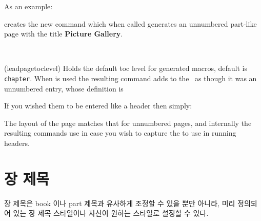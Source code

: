 As an example:
\begin{lcode}
\end{lcode}
creates the new command  which when called generates an unnumbered
part-like page with the title \textbf{Picture Gallery}.

\begin{syntax}
\cmd{\leadpagetoclevel} \\
\end{syntax}
\glossary(leadpagetoclevel)%
{}%
{Holds the default toc level for  generated macros,
default is \texttt{chapter}.}
When  is used the resulting command adds 
to the \toc\ as though it was an unnumbered \cmd{\leadpagetoclevel} entry,
whose definition is
\begin{lcode}
\newcommand*{\leadpagetoclevel}{chapter}
\end{lcode}
If you wished them to be entered like a \cmd{\part} header then simply:
\begin{lcode}
\renewcommand*{\leadpagetoclevel}{part}
\end{lcode}


    The layout of the page matches that for unnumbered \cmd{\part} pages, and 
internally the resulting commands use \cmd{\partmark} in case you 
wish to capture the  to use in running headers.


\section{장 제목}
\label{sec:chapter-headings}


장 제목은 book 이나 part 제목과 유사하게 조정할 수 있을 뿐만 아니라,
미리 정의되어 있는 장 제목 스타일이나 자신이 원하는 스타일로 설정할 수 있다.

